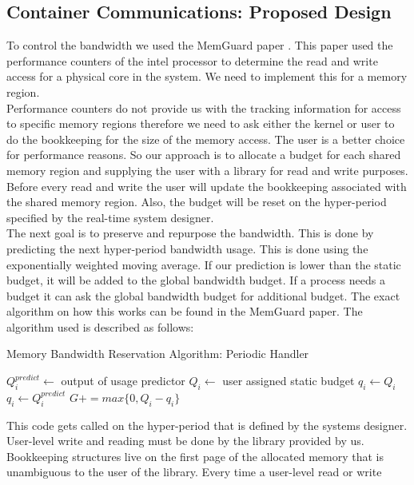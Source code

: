 \documentclass[a4paper, 11pt, twocolumn]{article}
\theoremstyle{nonumberplain}
\begin{document}
\subsection{Container Communications: Proposed Design}
To control the bandwidth we used the MemGuard paper \cite{memguard}.
This paper used the performance counters of the intel processor to determine
the read and write access for a physical core in the system. We need to
implement this for a memory region. \\
Performance counters do not provide us with the tracking information for access
to specific memory regions therefore we need to ask either the kernel or
user to do the bookkeeping for the size of the memory access. The user is a better
choice for performance reasons. So our approach is to allocate a budget for each
shared memory region and supplying the user with a library for read and write
purposes. Before every read and write the user will update the bookkeeping
associated with the shared memory region. Also, the budget will be reset on
the hyper-period specified by the real-time system designer. \\
The next goal is to preserve and repurpose the bandwidth. This is done by
predicting the next hyper-period bandwidth usage. This is done using
the exponentially weighted moving average. If our prediction is lower than
the static budget, it will be added to the global bandwidth budget. If a process
needs a budget it can ask the global bandwidth budget for additional budget.
The exact algorithm on how this works can be found in the MemGuard \cite{memguard}
paper. The algorithm used is described as follows:
\begin{algorithm}[h]
    \caption{Memory Bandwidth Reservation Algorithm: Periodic Handler}
    \begin{algorithmic}
        \Begin
            \State $Q_i^{predict} \gets$ output of usage predictor
            \State $Q_i \gets$ user assigned static budget
                \State $q_i \gets Q_i$
            \Else
                \State $q_i \gets Q_i^{predict}$
            \EndIf
            \State $G += max\{0,Q_i-q_i\}$
        \End
    \end{algorithmic}
\end{algorithm}
This code gets called on the hyper-period that is defined by the systems
designer.
User-level write and reading must be done by the library provided by us.
Bookkeeping structures live on the first page of the allocated memory that
is unambiguous to the user of the library. Every time a user-level read or write
\end{document}
